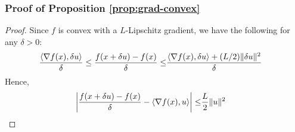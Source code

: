 
\subsubsection*{Proof of Proposition \ref{prop:grad-convex}}
\begin{proof}
Since $f$ is convex with a  $L$-Lipschitz gradient, we have the following for any $\delta>0$:
\begin{align*}
\frac{\left\langle\nabla f(x), \delta u\right\rangle}{\delta} \le \frac{f(x + \delta u) -  f(x)}{\delta} \le& \frac{\left\langle\nabla f(x), \delta u\right\rangle + (L / 2) \|\delta u\|^2}{\delta}
\end{align*}
Hence,
\begin{align*}
\left|\frac{f(x + \delta u) -  f(x)}{\delta} - \left\langle\nabla f(x),  u\right\rangle \right| \le&  \dfrac{L}{2} \|u\|^2
\end{align*}

\end{proof}



